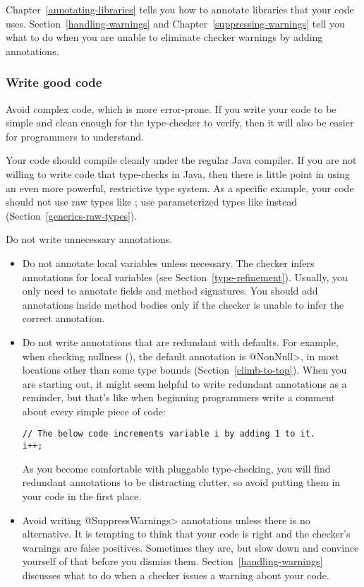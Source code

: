 Chapter~\ref{annotating-libraries} tells you how to annotate libraries that
your code uses.  Section~\ref{handling-warnings} and
Chapter~\ref{suppressing-warnings} tell you what to do when you are unable
to eliminate checker warnings by adding annotations.


\subsubsection{Write good code\label{get-started-write-good-code}}

Avoid complex code, which is more error-prone.  If you write your code to
be simple and clean enough for the type-checker to verify, then it will
also be easier for programmers to understand.

Your code should compile cleanly under the regular Java compiler.  If you
are not willing to write code that type-checks in Java, then there is
little point in using an even more powerful, restrictive type system.  As a
specific example, your code should not use raw types like ; use
parameterized types like  instead
(Section~\ref{generics-raw-types}).

Do not write unnecessary annotations.
\begin{itemize}
\item
  Do not annotate local variables unless necessary.  The checker infers
  annotations for local variables (see Section~\ref{type-refinement}).
  Usually, you only need to annotate fields and method signatures.  You
  should add annotations inside method bodies only if the checker is unable
  to infer the correct annotation.


\item
  Do not write annotations that are redundant with defaults.  For example,
  when checking nullness (), the default
  annotation is \<@NonNull>, in most locations other than some type bounds
  (Section~\ref{climb-to-top}).  When you are starting out, it might seem
  helpful to write redundant annotations as a reminder, but that's like
  when beginning programmers write a comment about every simple piece of
  code:

\begin{Verbatim}
// The below code increments variable i by adding 1 to it.
i++;
\end{Verbatim}

  As you become comfortable with pluggable type-checking, you will find
  redundant annotations to be distracting clutter, so avoid putting them in
  your code in the first place.

\item
  Avoid writing \<@SuppressWarnings> annotations unless there is no
  alternative.  It is tempting to think that your code is right and the
  checker's warnings are false positives.  Sometimes they are, but slow
  down and convince yourself of that before you dismiss them.
  Section~\ref{handling-warnings} discusses what to do when a checker
  issues a warning about your code.

\end{itemize}


